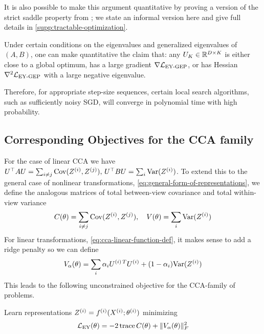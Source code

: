 It is also possible to make this argument quantitative by proving a version of the strict saddle property from \cite{ge_no_2017,ge2015escaping}; we state an informal version here and give full details in \cref{supp:tractable-optimization}.

\begin{corollary}
    Under certain conditions on the eigenvalues and generalized eigenvalues of $(A,B)$, one can make quantitative the claim that:
    any $U_K \in \mathbb{R}^{D \times K}$ is either close to a global optimum, has a large gradient $\nabla \mathcal{L}_\text{EY-GEP}$, or has Hessian $\nabla^2 \mathcal{L}_\text{EY-GEP}$ with a large negative eigenvalue.
    
    Therefore, for appropriate step-size sequences, certain local search algorithms, such as sufficiently noisy SGD, will converge in polynomial time with high probability.
\end{corollary}

\subsection{Corresponding Objectives for the CCA family}
For the case of linear CCA we have $U^\top A U = \sum_{i \neq j} \mathrm{Cov}(Z^{(i)}, Z^{(j)}),\,  U^\top B U = \sum_{i} \mathrm{Var}(Z^{(i)})$. 
To extend this to the general case of nonlinear transformations, \cref{eq:general-form-of-representations}, we define the analogous matrices of total between-view covariance and total within-view variance 
\begin{align}\label{eq:def-C-V-matrices}
    \vphantom{\bigl(\bigr)} %
    C(\theta) = \sum_{i \neq j} \Cov(Z\sps{i}, Z\sps{j}), \quad 
    V(\theta) = \sum_{i} \Var(Z\sps{i})
\end{align}
For linear transformations, \cref{eq:cca-linear-function-def}, it makes sense to add a ridge penalty so we can define
\begin{align}\label{eq:v-alpha-ridge-definition}
    V_\alpha(\theta) = \sum_i \alpha_i {U^{(i)\,T}} U^{(i)} +  (1 - \alpha_i) \mathrm{Var}(Z^{(i)})
\end{align}
This leads to the following unconstrained objective for the CCA-family of problems.
\begin{definition}
    Learn representations $Z^{(i)} = f^{(i)}( X^{(i)}; \theta^{(i)})$ minimizing
    \begin{align}\label{eq:EY-loss-def-C-V}
        \mathcal{L}_\text{EY}(\theta) = - 2 \operatorname{trace} C(\theta) + \lVert V_\alpha(\theta)\rVert_F^2
    \end{align}
\end{definition}

